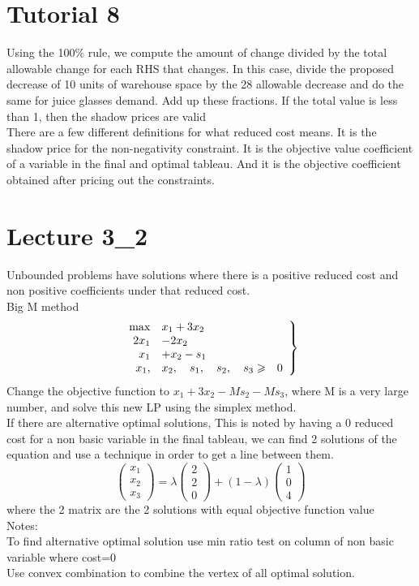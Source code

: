 \documentclass{article}
\begin{document}
\section{Tutorial 8}
Using the 100\% rule, we compute the amount of change divided by the total allowable change for each RHS that changes.  In this case, divide the proposed decrease of 10 units of warehouse space by the 28 allowable decrease and do the same for juice glasses demand.  Add up these fractions.  If the total value is less than 1, then the shadow prices are valid\\
There are a few different definitions for what reduced cost means.  It is the shadow price for the non-negativity constraint.  It is the objective value coefficient of a variable in the final and optimal tableau.  And it is the objective coefficient obtained after pricing out the constraints.\\
\section{Lecture 3\_2}
Unbounded problems have solutions where there is a positive reduced cost and non positive coefficients under that reduced cost.\\
Big M method
$$
\left.\begin{array} { r l c } { \max } & { x _ { 1 } + 3 x _ { 2 } } \\ { 2 x _ { 1 } } & { - 2 x _ { 2 } } \\ { x _ { 1 } } & { + x _ { 2 } - s _ { 1 } } \\ { x _ { 1 } , } & { x _ { 2 } , \quad s _ { 1 } , \quad s _ { 2 } , \quad s _ { 3 } \geqslant } & { 0 } \end{array} \right\}
$$
Change the objective function to $x_1 + 3x_2 - Ms_2 - Ms_3$,
where M is a very large number, and solve this new LP
using the simplex method.\\
If there are alternative optimal solutions, This is noted by having a 0 reduced cost for a non basic variable in the final tableau, we can find 2 solutions of the equation and use a technique in order to  get a line between them.
\[
\begin{pmatrix}
    x_1     \\
    x_2      \\
    x_3
\end{pmatrix}
=
\lambda
\begin{pmatrix}
    2     \\
    2\\
    0
\end{pmatrix}
+ (1-\lambda)
\begin{pmatrix}
    1      \\
    0       \\
    4
\end{pmatrix}
\]
where the 2 matrix are the 2 solutions with equal objective function value\\
Notes:\\
To find alternative optimal solution use min ratio test on column of non basic variable where cost=0\\
Use convex combination to combine the vertex of all optimal solution.\\
\end{document}
